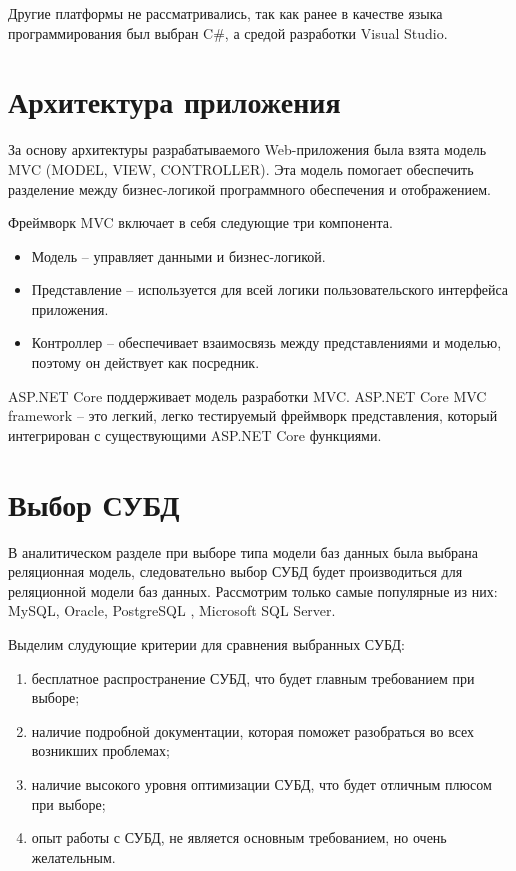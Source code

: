 Другие платформы не рассматривались, так как ранее в качестве языка программирования был выбран C\#, а средой разработки Visual Studio.

\section{Архитектура приложения}

За основу архитектуры разрабатываемого Web-приложения была взята модель MVC (MODEL, VIEW, CONTROLLER). Эта модель помогает обеспечить разделение между бизнес-логикой программного обеспечения и отображением. 

Фреймворк MVC включает в себя следующие три компонента.

\begin{itemize}
    \item Модель -- управляет данными и бизнес-логикой.
    \item Представление --  используется для всей логики пользовательского интерфейса приложения.
    \item Контроллер -- обеспечивает взаимосвязь между представлениями и моделью, поэтому он действует как посредник.
\end{itemize}

ASP.NET Core поддерживает модель разработки MVC. ASP.NET Core MVC framework \cite{mvc} -- это легкий, легко тестируемый фреймворк представления, который интегрирован с существующими ASP.NET Core функциями.

\section{Выбор СУБД}

В аналитическом разделе при выборе типа модели баз данных была выбрана реляционная модель, следовательно выбор СУБД будет производиться для реляционной модели баз данных. Рассмотрим только самые популярные из них: MySQL, Oracle, PostgreSQL \cite{postgresql}, Microsoft SQL Server.

Выделим слудующие критерии для сравнения выбранных СУБД:

\begin{enumerate}
    \item бесплатное распространение СУБД, что будет главным требованием при выборе;
    \item наличие подробной документации, которая поможет разобраться во всех возникших проблемах;
    \item наличие высокого уровня оптимизации СУБД, что будет отличным плюсом при выборе;
    \item опыт работы с СУБД, не является основным требованием, но очень желательным.
\end{enumerate}

